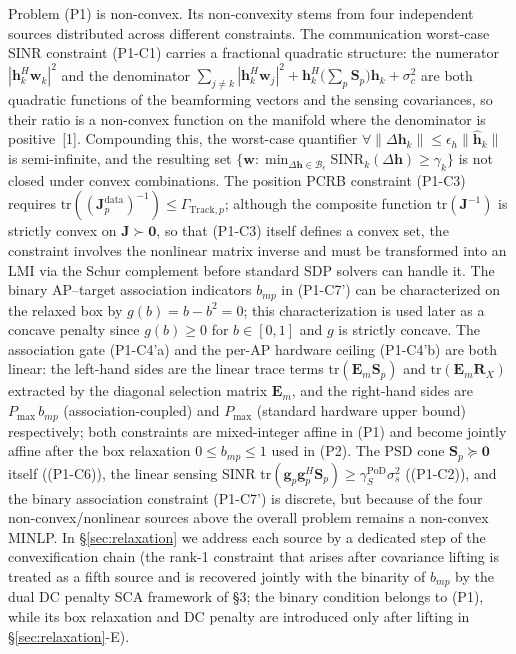 \documentclass[12pt,a4paper]{article}
\newcommand{\vect}[1]{\mathbf{#1}}
\newcommand{\mat}[1]{\mathbf{#1}}
\newcommand{\tr}{\text{tr}}
\begin{document}
Problem (P1) is non-convex. Its non-convexity stems from four independent sources distributed across different constraints. The communication worst-case SINR constraint (P1-C1) carries a fractional quadratic structure: the numerator $|\vect{h}_k^H \vect{w}_k|^2$ and the denominator $\sum_{j \neq k} |\vect{h}_k^H \vect{w}_j|^2 + \vect{h}_k^H \big(\sum_p \mat{S}_p\big) \vect{h}_k + \sigma_c^2$ are both quadratic functions of the beamforming vectors and the sensing covariances, so their ratio is a non-convex function on the manifold where the denominator is positive~[1]. Compounding this, the worst-case quantifier $\forall \|\Delta\vect{h}_k\| \leq \epsilon_h \|\hat{\vect{h}}_k\|$ is semi-infinite, and the resulting set $\{\vect{w} : \min_{\Delta\vect{h} \in \mathcal{B}_\epsilon} \text{SINR}_k(\Delta\vect{h}) \geq \gamma_k\}$ is not closed under convex combinations. The position PCRB constraint (P1-C3) requires $\tr((\mat{J}_p^{\text{data}})^{-1}) \leq \Gamma_{\text{Track}, p}$; although the composite function $\tr(\mat{J}^{-1})$ is strictly convex on $\mat{J} \succ \mat{0}$, so that (P1-C3) itself defines a convex set, the constraint involves the nonlinear matrix inverse and must be transformed into an LMI via the Schur complement before standard SDP solvers can handle it. The binary AP--target association indicators $b_{mp}$ in (P1-C7') can be characterized on the relaxed box by $g(b)=b-b^2=0$; this characterization is used later as a concave penalty since $g(b) \geq 0$ for $b \in [0,1]$ and $g$ is strictly concave. The association gate (P1-C4'a) and the per-AP hardware ceiling (P1-C4'b) are both linear: the left-hand sides are the linear trace terms $\tr(\mat{E}_m \mat{S}_p)$ and $\tr(\mat{E}_m \mat{R}_X)$ extracted by the diagonal selection matrix $\mat{E}_m$, and the right-hand sides are $P_{\max} \, b_{mp}$ (association-coupled) and $P_{\max}$ (standard hardware upper bound) respectively; both constraints are mixed-integer affine in (P1) and become jointly affine after the box relaxation $0 \le b_{mp} \le 1$ used in (P2). The PSD cone $\mat{S}_p \succeq \mat{0}$ itself ((P1-C6)), the linear sensing SINR $\tr(\vect{g}_p \vect{g}_p^H \mat{S}_p) \geq \gamma_S^{\text{PoD}} \sigma_s^2$ ((P1-C2)), and the binary association constraint (P1-C7') is discrete, but because of the four non-convex/nonlinear sources above the overall problem remains a non-convex MINLP. In \S\ref{sec:relaxation} we address each source by a dedicated step of the convexification chain (the rank-1 constraint that arises after covariance lifting is treated as a fifth source and is recovered jointly with the binarity of $b_{mp}$ by the dual DC penalty SCA framework of \S3; the binary condition belongs to (P1), while its box relaxation and DC penalty are introduced only after lifting in \S\ref{sec:relaxation}-E).
\end{document}
